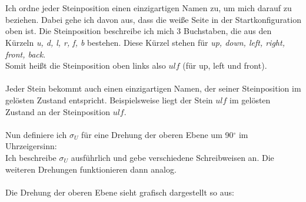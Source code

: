 \documentclass[12pt,a4paper, usenames, dvipsnames]{article}
\begin{document}
\ \\
\\
Ich ordne jeder Steinposition einen einzigartigen Namen zu, um mich darauf zu beziehen. Dabei gehe ich davon aus, dass die weiße Seite in der Startkonfiguration oben ist. Die Steinposition beschreibe ich mich 3 Buchstaben, die aus den Kürzeln \textit{u, d, l, r, f, b} bestehen. Diese Kürzel stehen für \textit{up, down, left, right, front, back}. \\
Somit heißt die Steinposition oben links also $ulf$ (für up, left und front). 
\\
\\
Jeder Stein bekommt auch einen einzigartigen Namen, der seiner Steinposition im gelösten Zustand entspricht. Beispielsweise liegt der Stein $ulf$ im gelösten Zustand an der Steinposition $ulf$.
\\ 
\\
Nun definiere ich $\sigma_U$ für eine Drehung der oberen Ebene um 90$^\circ$ im Uhrzeigersinn: \\
Ich beschreibe $\sigma_U$ ausführlich und gebe verschiedene Schreibweisen an. Die weiteren Drehungen funktionieren dann analog. \\
\\
Die Drehung der oberen Ebene sieht grafisch dargestellt so aus: \\
\end{document}
